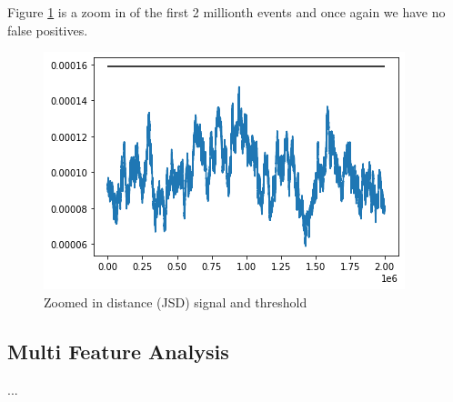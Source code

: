 Figure \ref{fig:JSD-signal-zoom-test05} is a zoom in of the first 2 millionth events and once again we have no false positives.
\begin{figure}[!htb]
    \begin{center}
      \includegraphics[scale=0.6]{figures/stream-analysis-viz-zoom-test05.png}
      \caption[]{Zoomed in distance (JSD) signal and threshold}
      \label{fig:JSD-signal-zoom-test05}
    \end{center}
\end{figure}

\subsection{Multi Feature Analysis}

...